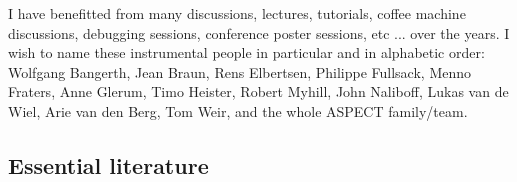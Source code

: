 \documentclass[a4paper]{article}
\begin{document}
I have benefitted from many discussions, lectures, tutorials, coffee machine 
discussions, debugging sessions, conference poster sessions, etc ... 
over the years. I wish to name these instrumental people in particular and 
in alphabetic order: 
Wolfgang Bangerth, 
Jean Braun, 
Rens Elbertsen,
Philippe Fullsack, 
Menno Fraters, 
Anne Glerum,
Timo Heister,
Robert Myhill,
John Naliboff,
Lukas van de Wiel,
Arie van den Berg, 
Tom Weir,
and the whole ASPECT family/team. 



\subsection{Essential literature} %
\end{document}
